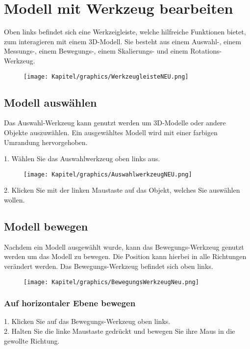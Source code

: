 \chapter{Modell mit Werkzeug bearbeiten}
Oben links befindet sich eine Werkzeigleiste, welche hilfreiche Funktionen bietet, zum interagieren mit einem 3D-Modell. Sie besteht aus einem Auswahl-, einem Messungs-, einem Bewegungs-, einem Skalierungs- und einem Rotations-Werkzeug.

\begin{figure}[th]
    \centering
    \texttt{[image: Kapitel/graphics/WerkzeugleisteNEU.png]}
    \label{fig:enter-label}
\end{figure}
\section{Modell auswählen}
Das Auswahl-Werkzeug kann genutzt werden um 3D-Modelle oder andere Objekte auszuwählen. Ein ausgewähltes Modell wird mit einer farbigen Umrandung hervorgehoben.

1. Wählen Sie das Auswahlwerkzeug oben links aus.\\
\begin{figure}[th]
    \centering
    \texttt{[image: Kapitel/graphics/AuswahlwerkzeugNEU.png]}
    \label{fig:enter-label}
\end{figure}2. Klicken Sie mit der linken Maustaste auf das Objekt, welches Sie auswählen wollen.

\newpage
\section{Modell bewegen}
Nachdem ein Modell ausgewählt wurde, kann das Bewegungs-Werkzeug genutzt werden um das Modell zu bewegen. Die Position kann hierbei in alle Richtungen verändert werden. Das Bewegungs-Werkzeug befindet sich oben links.

\begin{figure}[th!]
    \centering
    \texttt{[image: Kapitel/graphics/BewegungsWerkzeugNeu.png]}
    \label{fig:enter-label}
\end{figure}

\subsection{Auf horizontaler Ebene bewegen}
1. Klicken Sie auf das Bewegungs-Werkzeug oben links.\\
2. Halten Sie die linke Maustaste gedrückt und bewegen Sie ihre Maus in die gewollte Richtung.

